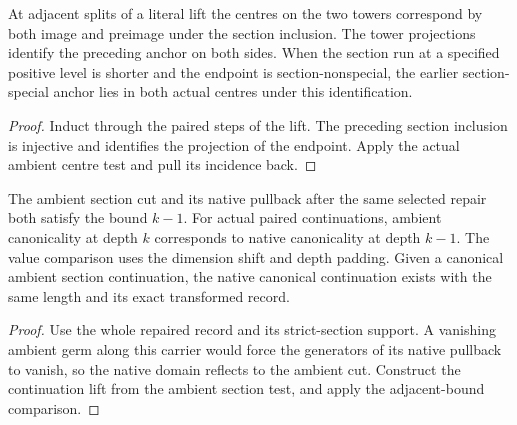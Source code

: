 \begin{theorem}
\label{hir:g1-positive-normal-actual-lift-centres}
\leanok
At adjacent splits of a literal lift the centres on the two towers
correspond by both image and preimage under the section inclusion.
The tower projections identify the preceding anchor on both sides.
When the section run at a specified positive level is shorter and the
endpoint is section-nonspecial, the earlier section-special anchor
lies in both actual centres under this identification.
\end{theorem}
\begin{proof}
Induct through the paired steps of the lift. The preceding section
inclusion is injective and identifies the projection of the endpoint.
Apply the actual ambient centre test and pull its incidence back.
\end{proof}

\begin{theorem}
\label{hir:g1-positive-normal-repair-depth}
\leanok
The ambient section cut and its native pullback after the same
selected repair both satisfy the bound $k-1$. For actual paired
continuations, ambient canonicality at depth $k$ corresponds to
native canonicality at depth $k-1$. The value comparison uses the
dimension shift and depth padding. Given a canonical ambient
section continuation, the native canonical continuation exists
with the same length and its exact transformed record.
\end{theorem}
\begin{proof}
Use the whole repaired record and its strict-section support. A
vanishing ambient germ along this carrier would force the generators
of its native pullback to vanish, so the native domain reflects to
the ambient cut. Construct the continuation lift from the ambient
section test, and apply the adjacent-bound comparison.
\end{proof}

